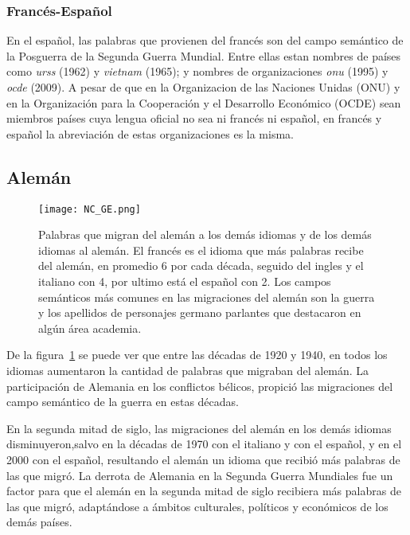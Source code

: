 \subsubsection*{Francés-Español}%


En el español, las palabras que provienen del francés son del campo semántico de la Posguerra de la Segunda Guerra Mundial. Entre ellas estan nombres de países como \textit{urss} (1962) y \textit{vietnam} (1965); y nombres de organizaciones \textit{onu} (1995) y  \textit{ocde} (2009). A pesar de que en la Organizacion de las Naciones Unidas (ONU) y en la Organización para la Cooperación y el Desarrollo Económico (OCDE) sean miembros países cuya lengua oficial no sea ni francés ni español,  en francés y español la abreviación de estas organizaciones es la misma.  

%




\subsection{Alemán}%

\begin{figure}[h!]
	\centering
	\texttt{[image: NC\_GE.png]}
	\caption{Palabras que migran del alemán a los demás idiomas y de los demás idiomas al alemán. El francés es el idioma que más palabras recibe del alemán,  en promedio 6 por cada década,  seguido del ingles y el italiano con 4,  por ultimo está el español con 2. Los campos semánticos más comunes en las migraciones del alemán son la guerra  y  los apellidos  de personajes germano parlantes que destacaron en algún área academia.}  
	\label{fig.NC_GE}
\end{figure}



De la figura~\ref{fig.NC_GE} se puede ver que entre las décadas de 1920 y 1940, en todos los idiomas aumentaron la cantidad de palabras que migraban del alemán. La participación de Alemania en los conflictos bélicos, propició las migraciones del campo semántico de la guerra en estas décadas. 

En la segunda mitad de siglo, las migraciones del alemán en los demás idiomas disminuyeron,salvo en la décadas de 1970 con el italiano y con el español, y en el 2000 con el español, resultando el alemán un idioma que recibió más palabras de las que migró. La derrota de Alemania en la Segunda Guerra Mundiales fue un factor para que el alemán en la segunda mitad de siglo recibiera más palabras de las que migró, adaptándose a ámbitos culturales, políticos y económicos de los demás países. 

